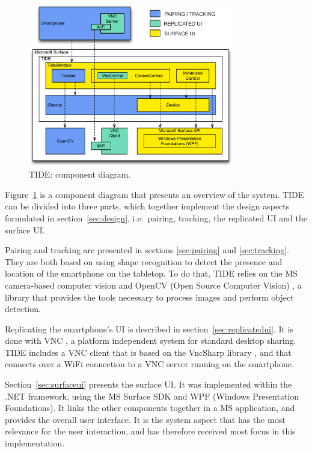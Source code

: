 \begin{figure}[htb]
  \centering
    \includegraphics[width=0.8\textwidth]{images/overviewNew}
    \caption{TIDE: component diagram.}
    \label{fig:overview}
\end{figure}

Figure~\ref{fig:overview} is a component diagram that presents an overview of the system.
TIDE can be divided into three parts, which together implement the design aspects formulated in section~\ref{sec:design}, i.e.\ pairing, tracking, the replicated UI and the surface UI.

Pairing and tracking are presented in sections \ref{sec:pairing} and \ref{sec:tracking}.
They are both based on using shape recognition to detect the presence and location of the smartphone on the tabletop.
To do that, TIDE relies on the MS camera-based computer vision and OpenCV (Open Source Computer Vision) \citeyearpar{opencv}, a library that provides the tools necessary to process images and perform object detection.

Replicating the smartphone's UI is described in section~\ref{sec:replicatedui}.
It is done with VNC \citep{Richardson:1998:vnc}, a platform independent system for standard desktop sharing.
TIDE includes a VNC client that is based on the VncSharp library \citep{vncsharp}, and that connects over a WiFi connection to a VNC server running on the smartphone.

Section~\ref{sec:surfaceui} presents the surface UI.
It was implemented within the .NET framework, using the MS Surface SDK and WPF (Windows Presentation Foundations).
It links the other components together in a MS application, and provides the overall user interface.
It is the system aspect that has the most relevance for the user interaction, and has therefore received most focus in this implementation.

